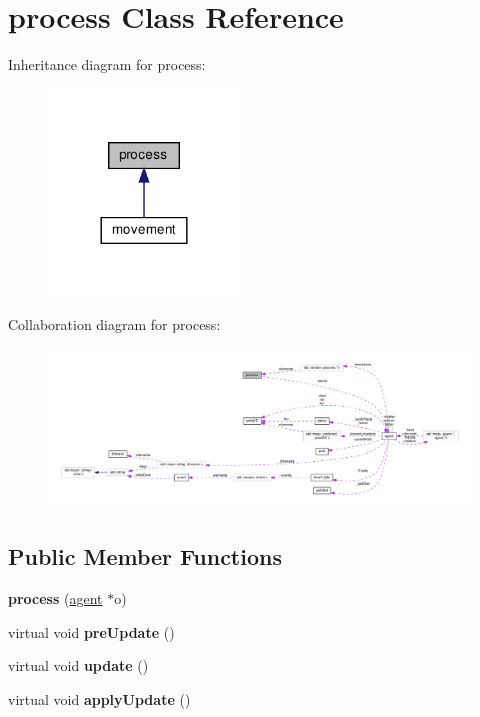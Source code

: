 \hypertarget{classprocess}{}\section{process Class Reference}
\label{classprocess}


Inheritance diagram for process\+:
\nopagebreak
\begin{figure}[H]
\begin{center}
\leavevmode
\includegraphics[width=144pt]{classprocess__inherit__graph}
\end{center}
\end{figure}


Collaboration diagram for process\+:
\nopagebreak
\begin{figure}[H]
\begin{center}
\leavevmode
\includegraphics[width=350pt]{classprocess__coll__graph}
\end{center}
\end{figure}
\subsection*{Public Member Functions}
\begin{DoxyCompactItemize}
\item 
\mbox{\label{classprocess_ab165eda9f0877f7c9b51b7e8a20090cb}} 
{\bfseries process} (\mbox{\hyperlink{classagent}{agent}} $\ast$o)
\item 
\mbox{\label{classprocess_a01cbd2a12c5ebb9f0d26ab0af1af1698}} 
virtual void {\bfseries pre\+Update} ()
\item 
\mbox{\label{classprocess_a221e8cbecf1f1b241e649db12cbea25f}} 
virtual void {\bfseries update} ()
\item 
\mbox{\label{classprocess_a3c856111d8e7c3e123ffb826ed1c4cd1}} 
virtual void {\bfseries apply\+Update} ()
\end{DoxyCompactItemize}
